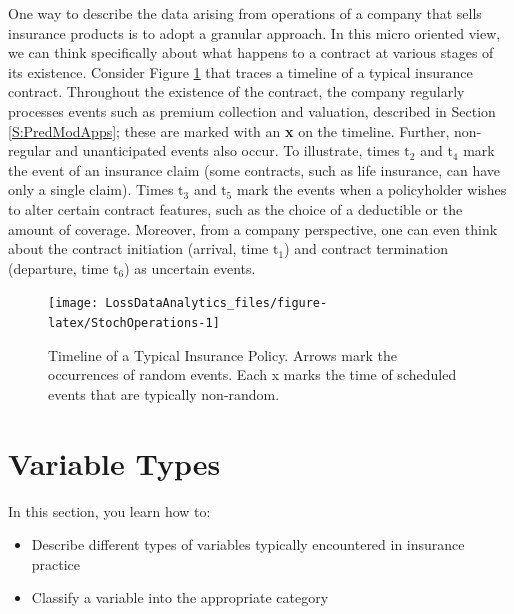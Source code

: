 \documentclass[]{book}
\providecommand{\tightlist}{%
  \setlength{\itemsep}{0pt}\setlength{\parskip}{0pt}}
\begin{document}
One way to describe the data arising from operations of a company that
sells insurance products is to adopt a granular approach. In this micro
oriented view, we can think specifically about what happens to a
contract at various stages of its existence. Consider Figure
\ref{fig:StochOperations} that traces a timeline of a typical insurance
contract. Throughout the existence of the contract, the company
regularly processes events such as premium collection and valuation,
described in Section \ref{S:PredModApps}; these are marked with an
\textbf{x} on the timeline. Further, non-regular and unanticipated
events also occur. To illustrate, times \(\mathrm{t}_2\) and
\(\mathrm{t}_4\) mark the event of an insurance claim (some contracts,
such as life insurance, can have only a single claim). Times
\(\mathrm{t}_3\) and \(\mathrm{t}_5\) mark the events when a
policyholder wishes to alter certain contract features, such as the
choice of a deductible or the amount of coverage. Moreover, from a
company perspective, one can even think about the contract initiation
(arrival, time \(\mathrm{t}_1\)) and contract termination (departure,
time \(\mathrm{t}_6\)) as uncertain events.





\begin{figure}

{\centering \texttt{[image: LossDataAnalytics\_files/figure-latex/StochOperations-1]} 

}

\caption{Timeline of a Typical Insurance Policy. Arrows
mark the occurrences of random events. Each x marks the time of
scheduled events that are typically non-random.}\label{fig:StochOperations}
\end{figure}

\section{Variable Types}\label{variable-types}

In this section, you learn how to:

\begin{itemize}
\tightlist
\item
  Describe different types of variables typically encountered in
  insurance practice
\item
  Classify a variable into the appropriate category
\end{itemize}
\end{document}

